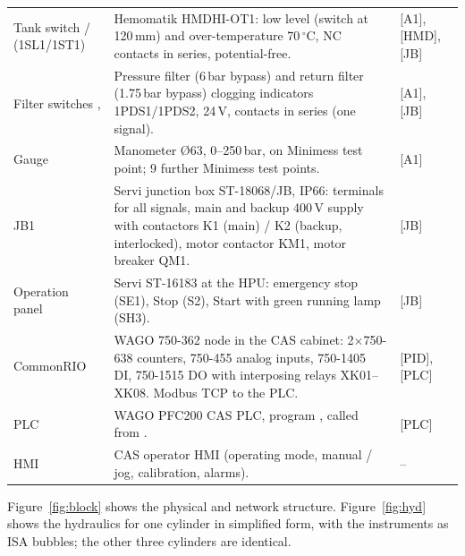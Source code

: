 \documentclass[11pt,a4paper]{article}
\newcommand{\prop}{\textsuperscript{\dag}}  %
\begin{document}
\begin{small}
\begin{tabularx}{\textwidth}{@{}P{30mm}LP{26mm}@{}}
Tank switch / (1SL1/1ST1) & Hemomatik HMDHI-OT1: low level (switch at 120\,mm) and over-temperature 70\,$^\circ$C, NC contacts in series, potential-free. & [A1], [HMD], [JB] \\
Filter switches \prop, \prop & Pressure filter (6\,bar bypass) and return filter (1.75\,bar bypass) clogging indicators 1PDS1/1PDS2, 24\,V, contacts in series (one signal). & [A1], [JB] \\
Gauge  & Manometer \O63, 0--250\,bar, on Minimess test point; 9 further Minimess test points. & [A1] \\
JB1 & Servi junction box ST-18068/JB, IP66: terminals for all signals, main and backup 400\,V supply with contactors K1 (main) / K2 (backup, interlocked), motor contactor KM1, motor breaker QM1. & [JB] \\
Operation panel & Servi ST-16183 at the HPU: emergency stop  (SE1), Stop (S2), Start with green running lamp (SH3). & [JB] \\
CommonRIO & WAGO 750-362 node in the CAS cabinet: 2$\times$750-638 counters, 750-455 analog inputs, 750-1405 DI, 750-1515 DO with interposing relays XK01--XK08. Modbus TCP to the PLC. & [PID], [PLC] \\
PLC & WAGO PFC200 CAS PLC, program , called from . & [PLC] \\
HMI & CAS operator HMI (operating mode, manual / jog, calibration, alarms). & -- \\
\bottomrule
\end{tabularx}
\end{small}

Figure~\ref{fig:block} shows the physical and network structure. Figure~\ref{fig:hyd} shows the
hydraulics for one cylinder in simplified form, with the instruments as ISA bubbles; the other three
cylinders are identical.
\end{document}
